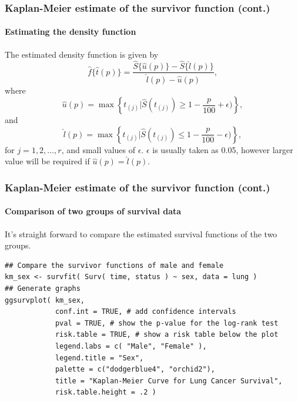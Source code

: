 \documentclass{beamer}
\begin{document}
	\begin{frame}
		\frametitle{Kaplan-Meier estimate of the survivor function (cont.)}
		\framesubtitle{Estimating the density function}
		The estimated density function is given by
		\[ \hat{ f }\{ \hat{ t }( p ) \} = \frac{ \hat{ S }\{\hat{ u }( p )\} - \hat{ S }\{\hat{ l }( p ) \} }{ \hat{ l }( p ) - \hat{ u }( p ) }, \]
		where 
		\[ \hat{ u }( p ) = \max \left\{ t_{ ( j ) } | \hat{ S }( t_{ ( j ) } ) \geq 1 - \frac{ p }{ 100 } + \epsilon )  \right\}, \]
		and 
		\[ \hat{ l }( p ) = \max \left\{ t_{ ( j ) } | \hat{ S }( t_{ ( j ) } ) \leq 1 - \frac{ p }{ 100 } - \epsilon )  \right\}, \]
		for $j = 1, 2, \dots, r$, and small values of $\epsilon$. $\epsilon$ is usually taken as 0.05, however larger value will be required if $\hat{ u }( p ) = \hat{ l }( p )$.
	\end{frame}
	
	\begin{frame}[fragile]
		\frametitle{Kaplan-Meier estimate of the survivor function (cont.)}
		\framesubtitle{Comparison of two groups of survival data}
		It's straight forward to compare the estimated survival functions of the two groups.
	    \begin{Verbatim}[fontsize=\small]
## Compare the survivor functions of male and female
km_sex <- survfit( Surv( time, status ) ~ sex, data = lung )
## Generate graphs
ggsurvplot( km_sex,
            conf.int = TRUE, # add confidence intervals
            pval = TRUE, # show the p-value for the log-rank test
            risk.table = TRUE, # show a risk table below the plot
            legend.labs = c( "Male", "Female" ),
            legend.title = "Sex",
            palette = c("dodgerblue4", "orchid2"),
            title = "Kaplan-Meier Curve for Lung Cancer Survival",
            risk.table.height = .2 )
	    \end{Verbatim}
	\end{frame}
	
\end{document}
